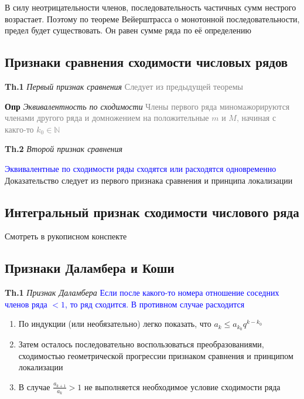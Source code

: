 В силу неотрицательности членов, последовательность частичных сумм нестрого возрастает.
Поэтому по теореме Вейерштрасса о монотонной последовательности, предел будет существовать.
Он равен сумме ряда по её определению

\subsection{Признаки сравнения сходимости числовых рядов}

\textbf{Th.1} \textit{Первый признак сравнения} \textcolor{gray}{Следует из предыдущей теоремы}

\textbf{Опр} \textit{Эквивалентность по сходимости} \textcolor{gray}{Члены первого ряда миномажорируются членами
другого ряда и домножением на положительные $m$ и $M$, начиная с какго-то $k_0 \in \mathbb{N}$}

\textbf{Th.2} \textit{Второй признак сравнения}

\textcolor{blue}{Эквивалентные по сходимости ряды сходятся или
расходятся одновременно} \\

Доказательство следует из первого признака сравнения и принципа локализации

\subsection{Интегральный признак сходимости числового ряда}

Смотреть в рукописном конспекте

\subsection{Признаки Даламбера и Коши}

\textbf{Th.1} \textit{Признак Даламбера} \textcolor{blue}{Если после какого-то номера отношение соседних членов
ряда $< 1$, то ряд сходится. В противном случае расходится}

\begin{enumerate}
    \item По индукции (или необязательно) легко показать, что $a_k \leq a_{k_0} q^{k - k_0}$
    \item Затем осталось последовательно воспользоваться преобразованиями, сходимостью геометрической прогрессии
    признаком сравнения и принципом локализации
    \item В случае $\frac{a_{k+1}}{a_k} > 1$ не выполняется необходимое условие сходимости ряда
\end{enumerate}

